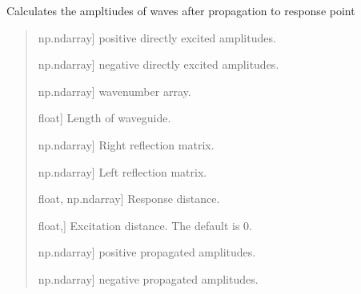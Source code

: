 \documentclass[letterpaper,10pt,english]{sphinxmanual}
\begin{document}
\begin{fulllineitems}
\label{\detokenize{core:pywfe.core.forced_problem.calculate_propagated_amplitudes}}
\pysigstartsignatures
{}
\pysigstopsignatures
\sphinxAtStartPar
Calculates the ampltiudes of waves after propagation to response point
\begin{quote}\begin{description}
\begin{description}
\sphinxlineitem{\sphinxstylestrong{e\_plus}}{[}np.ndarray{]}
\sphinxAtStartPar
positive directly excited amplitudes.

\sphinxlineitem{\sphinxstylestrong{e\_minus}}{[}np.ndarray{]}
\sphinxAtStartPar
negative directly excited amplitudes.

\sphinxlineitem{\sphinxstylestrong{k\_plus}}{[}np.ndarray{]}
\sphinxAtStartPar
wavenumber array.

\sphinxlineitem{\sphinxstylestrong{L}}{[}float{]}
\sphinxAtStartPar
Length of waveguide.

\sphinxlineitem{\sphinxstylestrong{R\_right}}{[}np.ndarray{]}
\sphinxAtStartPar
Right reflection matrix.

\sphinxlineitem{\sphinxstylestrong{R\_left}}{[}np.ndarray{]}
\sphinxAtStartPar
Left reflection matrix.

\sphinxlineitem{\sphinxstylestrong{x\_r}}{[}float, np.ndarray{]}
\sphinxAtStartPar
Response distance.

\sphinxlineitem{\sphinxstylestrong{x\_e}}{[}float,{]}
\sphinxAtStartPar
Excitation distance. The default is 0.

\end{description}

\begin{description}
\sphinxlineitem{\sphinxstylestrong{b\_plus}}{[}np.ndarray{]}
\sphinxAtStartPar
positive propagated amplitudes.

\sphinxlineitem{\sphinxstylestrong{b\_minus}}{[}np.ndarray{]}
\sphinxAtStartPar
negative propagated amplitudes.

\end{description}

\end{description}\end{quote}

\end{fulllineitems}
\end{document}
